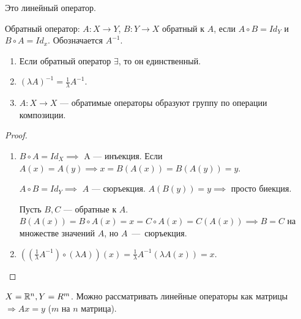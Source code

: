 \begin{remark}
    Это линейный оператор.
\end{remark}
\begin{definition}
    Обратный оператор: $A\!: X \to Y$,  $B\!: Y \to X$ обратный к  $A$, если  $A \circ B = Id_Y$ и  $B \circ A = Id_x$. Обозначается $A^{-1}$.
\end{definition}
\begin{properties}
    \begin{enumerate}
        \item Если обратный оператор $\exists$, то он единственный.
        \item  $(\lambda A)^{-1} = \frac{1}{\lambda} A^{-1}$.
        \item $A\!: X \to X$ --- обратимые операторы образуют группу по операции композиции.
    \end{enumerate}
\end{properties}
\begin{proof}
    \begin{enumerate}
        \item $B \circ A = Id_X \implies$ A --- инъекция. Если  $A(x) = A(y) \implies x = B(A(x)) = B(A(y)) = y$.

             $A \circ B = Id_Y \implies$  $A$ --- сюръекция.  $A(B(y)) = y \implies$ просто биекция. 

             Пусть  $B, C$ --- обратные к  $A$.  $B(A(x)) = B \circ A(x) = x = C \circ A(x) = C(A(x)) \implies B = C$ на множестве значений $A$, но $A$~---~сюръекция.
         \item $((\frac{1}{\lambda}A^{-1}) \circ (\lambda A))(x) = \frac{1}{\lambda}A^{-1}(\lambda A(x)) = x$.
    \end{enumerate}
\end{proof}
\begin{example}
    $X = \mathbb{R}^n, Y = R^m$. Можно рассматривать линейные операторы как матрицы $\Rightarrow Ax = y$ ($m$ на $n$ матрица).
\end{example}

